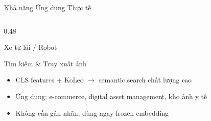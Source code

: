 \documentclass[aspectratio=169]{beamer}
\begin{document}
\begin{frame}[t,shrink=15]{Khả năng Ứng dụng Thực tế}
\begin{columns}[t]
\begin{column}{0.48\textwidth}
\begin{block}{Xe tự lái / Robot}
\begin{itemize}
                \end{itemize}
            \end{block}
            \vspace{0.2cm}
            \begin{block}{Tìm kiếm \& Truy xuất ảnh}
                \small
                \begin{itemize}
                    \item CLS features + KoLeo $\to$ semantic search chất lượng cao
                    \item Ứng dụng: e-commerce, digital asset management, kho ảnh y tế
                    \item Không cần gán nhãn, dùng ngay frozen embedding
                \end{itemize}
            \end{block}
        \end{column}
    \end{columns}
\end{frame}
\end{document}
